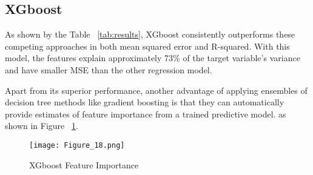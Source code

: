 \subsection{XGboost}

As shown by the Table ~\ref{tab:results}, XGboost consistently outperforms these
competing approaches in both mean squared error and R-squared.  With this model,
the features explain approximately 73\% of the target variable's variance and
have smaller MSE than the other regression model.

Apart from its superior performance, another advantage of applying ensembles of
decision tree methods like gradient boosting is that they can automatically
provide estimates of feature importance from a trained predictive model.
as shown in Figure ~\ref{fig:xgboost-feature-importantance}.
\begin{figure}[h]\centering
    \caption{XGboost Feature Importance}
    \texttt{[image: Figure\_18.png]}
    \label{fig:xgboost-feature-importantance}
\end{figure}

